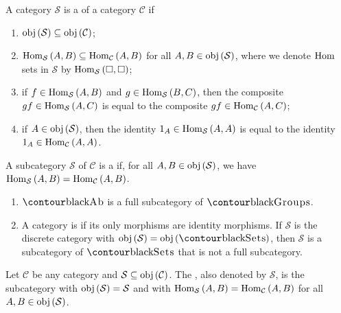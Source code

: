     \begin{definition}\label{def:subcategories}
        A category $\mathcal{S}$ is a  of a category $\mathcal{C}$ if
            \begin{enumerate}[label = (\arabic*)]
                \item $\operatorname{obj}{(\mathcal{S})} \subseteq \operatorname{obj}{(\mathcal{C})}$;
                \item $\operatorname{Hom}_{\mathcal{S}}{(A,B)} \subseteq \operatorname{Hom}_{\mathcal{C}}{(A,B)}$ for all $A,B \in \operatorname{obj}{(\mathcal{S})}$, where we denote $\operatorname{Hom}{}$ sets in $\mathcal{S}$ by $\operatorname{Hom}_\mathcal{S}{(\square,\square)}$;

                \item if $f \in \operatorname{Hom}_\mathcal{S}{(A,B)}$ and $g \in \operatorname{Hom}_\mathcal{S}{(B,C)}$, then the composite $gf \in \operatorname{Hom}_\mathcal{S}{(A,C)}$ is equal to the composite $gf \in \operatorname{Hom}_\mathcal{C}{(A,C)}$;

                \item if $A \in \operatorname{obj}{(\mathcal{S})}$, then the identity $1_A \in \operatorname{Hom}_\mathcal{S}{(A,A)}$ is equal to the identity $1_A \in \operatorname{Hom}_\mathcal{C}{(A,A)}$.
            \end{enumerate}
        A subcategory $\mathcal{S}$ of $\mathcal{C}$ is a  if, for all $A,B \in \operatorname{obj}{(\mathcal{S})}$, we have $\operatorname{Hom}_\mathcal{S}{(A,B)} = \operatorname{Hom}_\mathcal{C}{(A,B)}$.
    \end{definition}

    \begin{example}
        \phantom{a}
        \begin{enumerate}
            \item $\cAb$ is a full subcategory of $\cGroups$.
            \item A category is  if its only morphisms are identity morphisms. If $\mathcal{S}$ is the discrete category with $\obj{(\mathcal{S})} = \obj{(\cSets)}$, then $\mathcal{S}$ is a subcategory of $\cSets$ that is not a full subcategory.
        \end{enumerate}
    \end{example}

    \begin{definition}\label{def:generated-subcategory}
        Let $\mathcal{C}$ be any category and $\mathcal{S} \subseteq \operatorname{obj}{(\mathcal{C})}$. The , also denoted by $\mathcal{S}$, is the subcategory with $\operatorname{obj}{(\mathcal{S})} = \mathcal{S}$ and with $\operatorname{Hom}_\mathcal{S}{(A,B)} = \operatorname{Hom}_\mathcal{C}{(A,B)}$ for all $A,B \in \operatorname{obj}{(\mathcal{S})}$.
    \end{definition}

